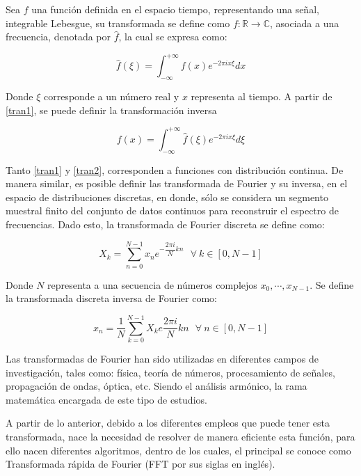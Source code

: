 Sea $f$ una función definida en el espacio tiempo, representando una señal, integrable Lebesgue, su transformada se define como $f: \mathbb{R} \to \mathbb{C}$, asociada a una frecuencia, denotada por $\hat{f}$, la cual se expresa como:

\begin{equation}
	\hat{f}(\xi) = \int_{-\infty}^{+\infty} f(x)e^{-2\pi i x \xi} dx
	\label{tran1}
\end{equation}

Donde $\xi$ corresponde a un número real y $x$ representa al tiempo. A partir de \ref{tran1}, se puede definir la transformación inversa

\begin{equation}
	f(x) = \int_{-\infty}^{+\infty} \hat{f}(\xi) e^{-2\pi i x \xi} d\xi
	\label{tran2}
\end{equation}

Tanto \ref{tran1} y \ref{tran2}, corresponden a funciones con distribución continua. De manera similar, es posible definir las transformada de Fourier y su inversa, en el espacio de distribuciones discretas, en donde, sólo se considera un segmento muestral finito del conjunto de datos continuos para reconstruir el espectro de frecuencias. Dado esto, la transformada de Fourier discreta se define como:

\begin{equation}
	X_k = \sum_{n=0}^{N-1} x_n e^{-\dfrac{2\pi i}{N} kn}\ \ \  \forall\  k \in [0, N-1]
\end{equation} 

Donde $N$ representa a una secuencia de números complejos $x_0, \cdots, x_{N-1}$. Se define la transformada discreta inversa de Fourier como:

\begin{equation}
	x_n = \dfrac{1}{N} \sum_{k=0}^{N-1} X_k e \dfrac{2\pi i}{N} kn \ \ \ \forall \ n \in [0, N-1]
\end{equation}

Las transformadas de Fourier han sido utilizadas en diferentes campos de investigación, tales como: física, teoría de números, procesamiento de señales, propagación de ondas, óptica, etc. Siendo el análisis armónico, la rama matemática encargada de este tipo de estudios.

A partir de lo anterior, debido a los diferentes empleos que puede tener esta transformada, nace la necesidad de resolver de manera eficiente esta función, para ello nacen diferentes algoritmos, dentro de los cuales, el principal se conoce como Transformada rápida de Fourier (FFT por sus siglas en inglés).
 
